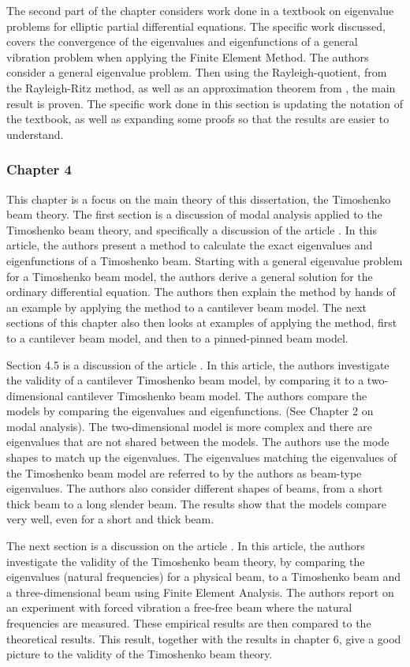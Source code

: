 \documentclass[../main.tex]{subfiles}
\begin{document}
The second part of the chapter considers work done in a textbook \cite{SF73} on eigenvalue problems for elliptic partial differential equations. The specific work discussed, covers the convergence of the eigenvalues and eigenfunctions of a general vibration problem when applying the Finite Element Method. The authors consider a general eigenvalue problem. Then using the Rayleigh-quotient, from the Rayleigh-Ritz method, as well as an approximation theorem from \cite{OR76}, the main result is proven. The specific work done in this section is updating the notation of the textbook, as well as expanding some proofs so that the results are easier to understand.

\subsubsection{Chapter 4}
This chapter is a focus on the main theory of this dissertation, the Timoshenko beam theory. The first section is a discussion of modal analysis applied to the Timoshenko beam theory, and specifically a discussion of the article \cite{VV06}. In this article, the authors present a method to calculate the exact eigenvalues and eigenfunctions of a Timoshenko beam. Starting with a general eigenvalue problem for a Timoshenko beam model, the authors derive a general solution for the ordinary differential equation. The authors then explain the method by hands of an example by applying the method to a cantilever beam model. The next sections of this chapter also then looks at examples of applying the method, first to a cantilever beam model, and then to a pinned-pinned beam model.

Section 4.5 is a discussion of the article \cite{LVV09}. In this article, the authors investigate the validity of a cantilever Timoshenko beam model, by comparing it to a two-dimensional cantilever Timoshenko beam model. The authors compare the models by comparing the eigenvalues and eigenfunctions. (See Chapter 2 on modal analysis). The two-dimensional model is more complex and there are eigenvalues that are not shared between the models. The authors use the mode shapes to match up the eigenvalues. The eigenvalues matching the eigenvalues of the Timoshenko beam model are referred to by the authors as beam-type eigenvalues. The authors also consider different shapes of beams, from a short thick beam to a long slender beam. The results show that the models compare very well, even for a short and thick beam.

The next section is a discussion on the article \cite{SP06}. In this article, the authors investigate the validity of the Timoshenko beam theory, by comparing the eigenvalues (natural frequencies) for a physical beam, to a Timoshenko beam and a three-dimensional beam using Finite Element Analysis. The authors report on an experiment with forced vibration a free-free beam where the natural frequencies are measured. These empirical results are then compared to the theoretical results. This result, together with the results in chapter 6, give a good picture to the validity of the Timoshenko beam theory.
\end{document}

